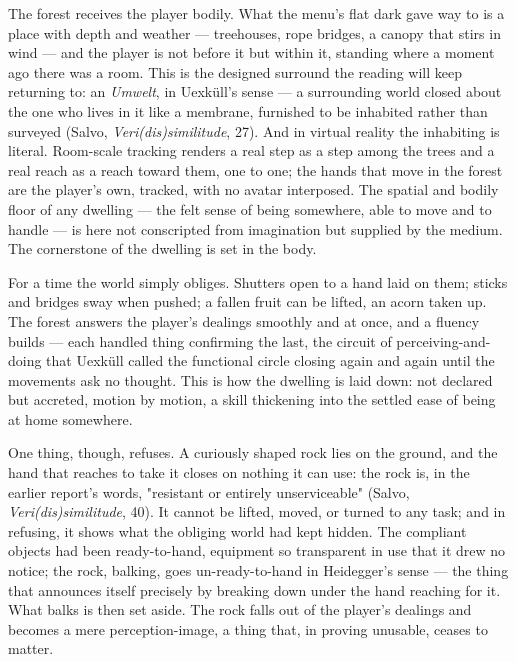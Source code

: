 \documentclass{article}
\begin{document}
The forest receives the player bodily. What the menu's flat dark gave way to is a place with depth and weather — treehouses, rope bridges, a canopy that stirs in wind — and the player is not before it but within it, standing where a moment ago there was a room. This is the designed surround the reading will keep returning to: an \textit{Umwelt}, in Uexküll's sense — a surrounding world closed about the one who lives in it like a membrane, furnished to be inhabited rather than surveyed (Salvo, \textit{Veri(dis)similitude}, 27). And in virtual reality the inhabiting is literal. Room-scale tracking renders a real step as a step among the trees and a real reach as a reach toward them, one to one; the hands that move in the forest are the player's own, tracked, with no avatar interposed. The spatial and bodily floor of any dwelling — the felt sense of being somewhere, able to move and to handle — is here not conscripted from imagination but supplied by the medium. The cornerstone of the dwelling is set in the body.

For a time the world simply obliges. Shutters open to a hand laid on them; sticks and bridges sway when pushed; a fallen fruit can be lifted, an acorn taken up. The forest answers the player's dealings smoothly and at once, and a fluency builds — each handled thing confirming the last, the circuit of perceiving-and-doing that Uexküll called the functional circle closing again and again until the movements ask no thought. This is how the dwelling is laid down: not declared but accreted, motion by motion, a skill thickening into the settled ease of being at home somewhere.

One thing, though, refuses. A curiously shaped rock lies on the ground, and the hand that reaches to take it closes on nothing it can use: the rock is, in the earlier report's words, "resistant or entirely unserviceable" (Salvo, \textit{Veri(dis)similitude}, 40). It cannot be lifted, moved, or turned to any task; and in refusing, it shows what the obliging world had kept hidden. The compliant objects had been ready-to-hand, equipment so transparent in use that it drew no notice; the rock, balking, goes un-ready-to-hand in Heidegger's sense — the thing that announces itself precisely by breaking down under the hand reaching for it. What balks is then set aside. The rock falls out of the player's dealings and becomes a mere perception-image, a thing that, in proving unusable, ceases to matter.
\end{document}
